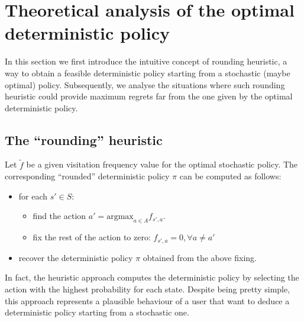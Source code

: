\section{Theoretical analysis of the optimal deterministic policy}\label{sec:comparison}

In this section we first introduce the intuitive concept of rounding heuristic, a way to obtain a feasible deterministic policy starting from a stochastic (maybe optimal) policy. Subsequently, we analyse the situations where such rounding heuristic could provide maximum regrets far from the one given by the optimal deterministic policy.

\subsection{The ``rounding'' heuristic}\label{sec:rounding}

Let $\tilde{f}$ be a given visitation frequency value for the optimal stochastic policy. The corresponding ``rounded'' deterministic policy $\pi$ can be computed as follows:

\begin{itemize}
\item for each $s'\in S$:
\begin{itemize}
\item find the action $a' = \text{argmax}_{a \in A}f_{s',a}$.
\item fix the rest of the action to zero: $f_{s',a} =0, \forall a \neq a'$
\end{itemize}
\item recover the deterministic policy $\pi$ obtained from the above fixing.
\end{itemize}
 
In fact, the heuristic approach computes the deterministic policy by selecting the action with the highest probability for each state. Despite being pretty simple, this approach represents a plausible behaviour of a user that want to deduce a deterministic policy starting from a stochastic one.  
%
%
%
%
%
